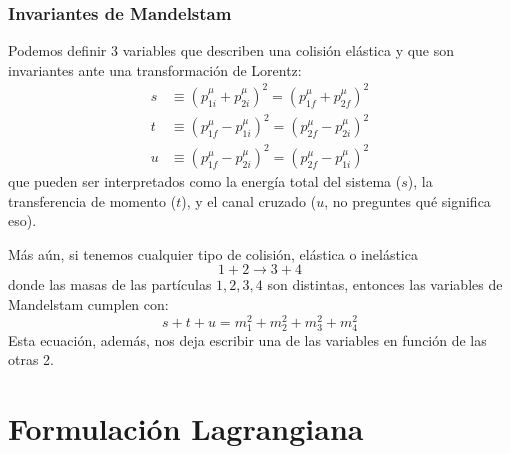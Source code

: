 \documentclass[]{article}
\numberwithin{equation}{section}
\begin{document}
\subsubsection{Invariantes de Mandelstam}
Podemos definir 3 variables que describen una colisión elástica y que son invariantes ante una transformación de Lorentz:
\begin{align}
	s &\equiv (p^\mu_{1i} + p^\mu_{2i})^2 = (p^\mu_{1f} + p^\mu_{2f})^2\\
	t &\equiv (p^\mu_{1f} - p^\mu_{1i})^2 = (p^\mu_{2f} - p^\mu_{2i})^2\\
	u &\equiv (p^\mu_{1f} - p^\mu_{2i})^2 = (p^\mu_{2f} - p^\mu_{1i})^2
\end{align}
que pueden ser interpretados como la energía total del sistema (\(s\)), la transferencia de momento (\(t\)), y el canal cruzado (\(u\), no preguntes qué significa eso).

Más aún, si tenemos cualquier tipo de colisión, elástica o inelástica
\begin{equation*}
	1 + 2 \rightarrow 3 + 4
\end{equation*}
donde las masas de las partículas \(1,2,3,4\) son distintas, entonces las variables de Mandelstam cumplen con:
\begin{equation}
	s+t+u = m_1^2 + m_2^2 + m_3^2 + m_4^2
\end{equation}
Esta ecuación, además, nos deja escribir una de las variables en función de las otras 2.
%



\section{Formulación Lagrangiana}
\end{document}
